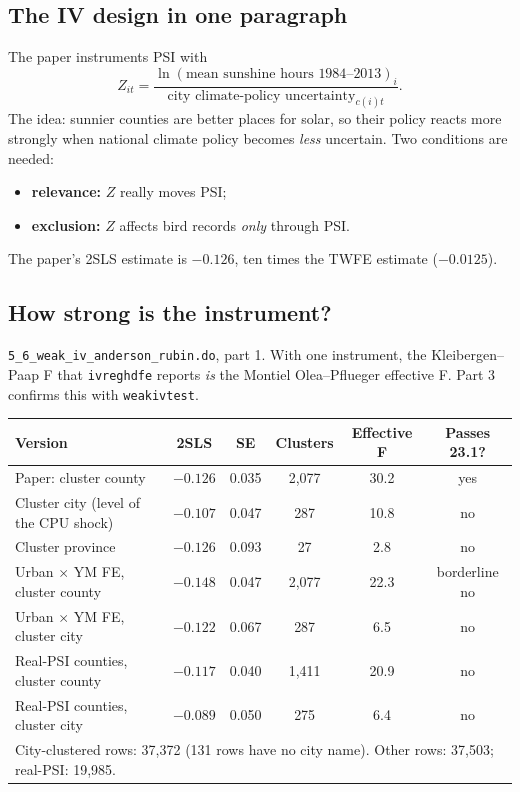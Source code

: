 \documentclass[11pt]{article}
\begin{document}
\subsection{The IV design in one paragraph}
The paper instruments PSI with
\[
Z_{it} = \frac{\ln(\text{mean sunshine hours } 1984\text{--}2013)_i}{\text{city climate-policy uncertainty}_{c(i)t}} .
\]
The idea: sunnier counties are better places for solar, so their policy reacts more strongly when national climate policy becomes \emph{less} uncertain. Two conditions are needed:
\begin{itemize}[leftmargin=14pt,itemsep=1pt]
\item \textbf{relevance:} $Z$ really moves PSI;
\item \textbf{exclusion:} $Z$ affects bird records \emph{only} through PSI.
\end{itemize}
The paper's 2SLS estimate is $-0.126$, ten times the TWFE estimate ($-0.0125$).

\subsection{How strong is the instrument?}
\texttt{5\_6\_weak\_iv\_anderson\_rubin.do}, part 1. With one instrument, the Kleibergen--Paap F that \texttt{ivreghdfe} reports \emph{is} the Montiel Olea--Pflueger effective F. Part 3 confirms this with \texttt{weakivtest}.

\begin{center}
\small
\begin{tabular}{l c c c c c}
\toprule
Version & 2SLS & SE & Clusters & Effective F & Passes 23.1? \\
\midrule
Paper: cluster county & $-0.126$ & 0.035 & 2,077 & 30.2 & \textcolor{good}{yes} \\
Cluster city (level of the CPU shock) & $-0.107$ & 0.047 & 287 & 10.8 & \textcolor{jhuorange}{no} \\
Cluster province & $-0.126$ & 0.093 & 27 & 2.8 & \textcolor{jhuorange}{no} \\
Urban $\times$ YM FE, cluster county & $-0.148$ & 0.047 & 2,077 & 22.3 & \textcolor{jhuorange}{borderline no} \\
Urban $\times$ YM FE, cluster city & $-0.122$ & 0.067 & 287 & 6.5 & \textcolor{jhuorange}{no} \\
Real-PSI counties, cluster county & $-0.117$ & 0.040 & 1,411 & 20.9 & \textcolor{jhuorange}{no} \\
Real-PSI counties, cluster city & $-0.089$ & 0.050 & 275 & 6.4 & \textcolor{jhuorange}{no} \\
\bottomrule
\multicolumn{6}{l}{\footnotesize City-clustered rows: 37,372 (131 rows have no city name). Other rows: 37,503; real-PSI: 19,985.}
\end{tabular}
\end{center}
\end{document}
